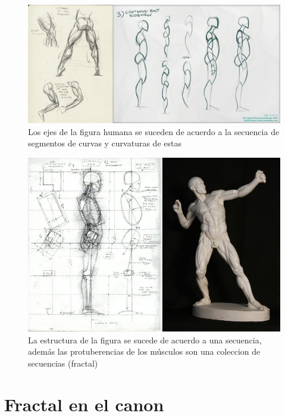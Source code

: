 \documentclass[
  11pt,
]{krantz}
\theoremstyle{definition}
\theoremstyle{definition}
\theoremstyle{definition}
\theoremstyle{definition}
\theoremstyle{remark}
\begin{document}
\begin{figure}[!ht]

{\centering \includegraphics[width=1\linewidth]{body} 

}

\caption{Los ejes de la figura humana se suceden de acuerdo a la secuencia de segmentos de curvas y curvaturas de estas}\label{fig:body}
\end{figure}
\begin{figure}[!ht]

{\centering \includegraphics[width=1\linewidth]{body2} 

}

\caption{La estructura de la figura se sucede de acuerdo a una secuencia, además las protuberencias de los músculos son una coleccion de secuencias (fractal)}\label{fig:body2}
\end{figure}

\hypertarget{fractal-en-el-canon}{%
\section{Fractal en el canon}\label{fractal-en-el-canon}}
\end{document}

